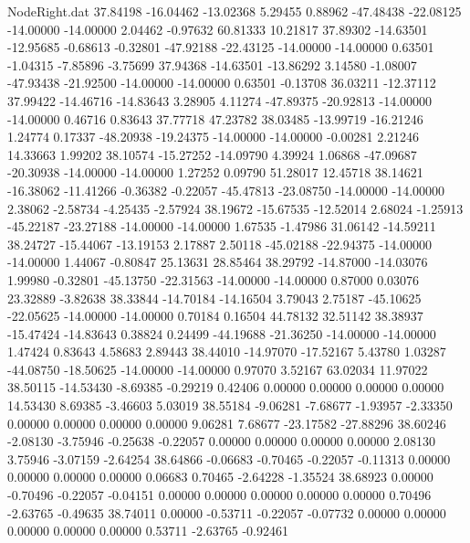 \begin{filecontents}{NodeRight.dat}
  37.84198  -16.04462  -13.02368     5.29455    0.88962  -47.48438  -22.08125  -14.00000  -14.00000    2.04462   -0.97632   60.81333   10.21817
  37.89302  -14.63501  -12.95685    -0.68613   -0.32801  -47.92188  -22.43125  -14.00000  -14.00000    0.63501   -1.04315   -7.85896   -3.75699
  37.94368  -14.63501  -13.86292     3.14580   -1.08007  -47.93438  -21.92500  -14.00000  -14.00000    0.63501   -0.13708   36.03211  -12.37112
  37.99422  -14.46716  -14.83643     3.28905    4.11274  -47.89375  -20.92813  -14.00000  -14.00000    0.46716    0.83643   37.77718   47.23782
  38.03485  -13.99719  -16.21246     1.24774    0.17337  -48.20938  -19.24375  -14.00000  -14.00000   -0.00281    2.21246   14.33663    1.99202
  38.10574  -15.27252  -14.09790     4.39924    1.06868  -47.09687  -20.30938  -14.00000  -14.00000    1.27252    0.09790   51.28017   12.45718
  38.14621  -16.38062  -11.41266    -0.36382   -0.22057  -45.47813  -23.08750  -14.00000  -14.00000    2.38062   -2.58734   -4.25435   -2.57924
  38.19672  -15.67535  -12.52014     2.68024   -1.25913  -45.22187  -23.27188  -14.00000  -14.00000    1.67535   -1.47986   31.06142  -14.59211
  38.24727  -15.44067  -13.19153     2.17887    2.50118  -45.02188  -22.94375  -14.00000  -14.00000    1.44067   -0.80847   25.13631   28.85464
  38.29792  -14.87000  -14.03076     1.99980   -0.32801  -45.13750  -22.31563  -14.00000  -14.00000    0.87000    0.03076   23.32889   -3.82638
  38.33844  -14.70184  -14.16504     3.79043    2.75187  -45.10625  -22.05625  -14.00000  -14.00000    0.70184    0.16504   44.78132   32.51142
  38.38937  -15.47424  -14.83643     0.38824    0.24499  -44.19688  -21.36250  -14.00000  -14.00000    1.47424    0.83643    4.58683    2.89443
  38.44010  -14.97070  -17.52167     5.43780    1.03287  -44.08750  -18.50625  -14.00000  -14.00000    0.97070    3.52167   63.02034   11.97022
  38.50115  -14.53430   -8.69385    -0.29219    0.42406    0.00000    0.00000    0.00000    0.00000   14.53430    8.69385   -3.46603    5.03019
  38.55184   -9.06281   -7.68677    -1.93957   -2.33350    0.00000    0.00000    0.00000    0.00000    9.06281    7.68677  -23.17582  -27.88296
  38.60246   -2.08130   -3.75946    -0.25638   -0.22057    0.00000    0.00000    0.00000    0.00000    2.08130    3.75946   -3.07159   -2.64254
  38.64866   -0.06683   -0.70465    -0.22057   -0.11313    0.00000    0.00000    0.00000    0.00000    0.06683    0.70465   -2.64228   -1.35524
  38.68923    0.00000   -0.70496    -0.22057   -0.04151    0.00000    0.00000    0.00000    0.00000    0.00000    0.70496   -2.63765   -0.49635
  38.74011    0.00000   -0.53711    -0.22057   -0.07732    0.00000    0.00000    0.00000    0.00000    0.00000    0.53711   -2.63765   -0.92461

\end{filecontents}

